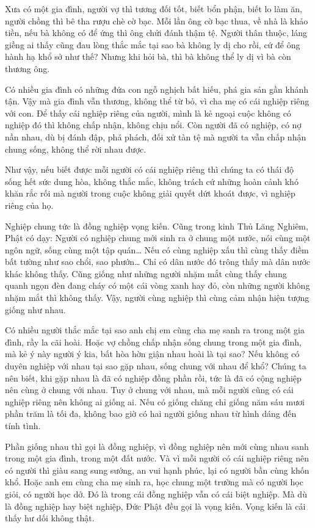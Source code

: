 \documentclass[
  12pt,
  oneside]{book}
\begin{document}
Xưa có một gia đình, người vợ thì tương đối tốt, biết bổn phận, biết lo làm ăn, người chồng thì bê tha rượu chè cờ bạc. Mỗi lần ông cờ bạc thua, về nhà là khảo tiền, nếu bà không có để ứng thì ông chửi đánh thậm tệ. Người thân thuộc, láng giềng ai thấy cũng đau lòng thắc mắc tại sao bà không ly dị cho rồi, cứ để ông hành hạ khổ sở như thế? Nhưng khi hỏi bà, thì bà không thể ly dị vì bà còn thương ông.

Có nhiều gia đình có những đứa con ngỗ nghịch bất hiếu, phá gia sản gần khánh tận. Vậy mà gia đình vẫn thương, không thể từ bỏ, vì cha mẹ có cái nghiệp riêng với con. Để thấy cái nghiệp riêng của người, mình là kẻ ngoại cuộc không có nghiệp đó thì không chấp nhận, không chịu nổi. Còn người đã có nghiệp, có nợ nần nhau, dù bị đánh đập, phá phách, đối xử tàn tệ mà người ta vẫn chấp nhận chung sống, không thể rời nhau được.

Như vậy, nếu biết được mỗi người có cái nghiệp riêng thì chúng ta có thái độ sống hết sức dung hòa, không thắc mắc, không trách cứ những hoàn cảnh khó khăn rắc rối mà người trong cuộc không giải quyết dứt khoát được, vì nghiệp riêng của họ.

Nghiệp chung tức là đồng nghiệp vọng kiến. Cũng trong kinh Thủ Lăng Nghiêm, Phật có dạy: Người có nghiệp chung mới sinh ra ở chung một nước, nói cùng một ngôn ngữ, sống cùng một tập quán\ldots{} Nếu có cùng nghiệp xấu thì cùng thấy điềm bất tường như sao chổi, sao phướn\ldots{} Chỉ có dân nước đó trông thấy mà dân nước khác không thấy. Cũng giống như những người nhặm mắt cùng thấy chung quanh ngọn đèn đang cháy có một cái vòng xanh hay đỏ, còn những người không nhặm mắt thì không thấy. Vậy, người cùng nghiệp thì cùng cảm nhận hiện tượng giống như nhau.

Có nhiều người thắc mắc tại sao anh chị em cùng cha mẹ sanh ra trong một gia đình, rầy la cãi hoài. Hoặc vợ chồng chấp nhận sống chung trong một gia đình, mà kẻ ý này người ý kia, bất hòa hờn giận nhau hoài là tại sao? Nếu không có duyên nghiệp với nhau tại sao gặp nhau, sống chung với nhau để khổ? Chúng ta nên biết, khi gặp nhau là đã có nghiệp đồng phần rồi, tức là đã có cộng nghiệp nên cùng ở chung với nhau. Tuy ở chung với nhau, mà mỗi người cũng có cái nghiệp riêng nên không ai giống ai. Nếu có giống chăng chỉ giống năm sáu mươi phần trăm là tối đa, không bao giờ có hai người giống nhau từ hình dáng đến tính tình.

Phần giống nhau thì gọi là đồng nghiệp, vì đồng nghiệp nên mới cùng nhau sanh trong một gia đình, trong một đất nước. Và vì mỗi người có cái nghiệp riêng nên có người thì giàu sang sung sướng, an vui hạnh phúc, lại có người bần cùng khốn khổ. Hoặc anh em cùng cha mẹ sinh ra, học chung một trường mà có người học giỏi, có người học dở. Đó là trong cái đồng nghiệp vẫn có cái biệt nghiệp. Mà dù là đồng nghiệp hay biệt nghiệp, Đức Phật đều gọi là vọng kiến. Vọng kiến là cái thấy hư dối không thật.
\end{document}
